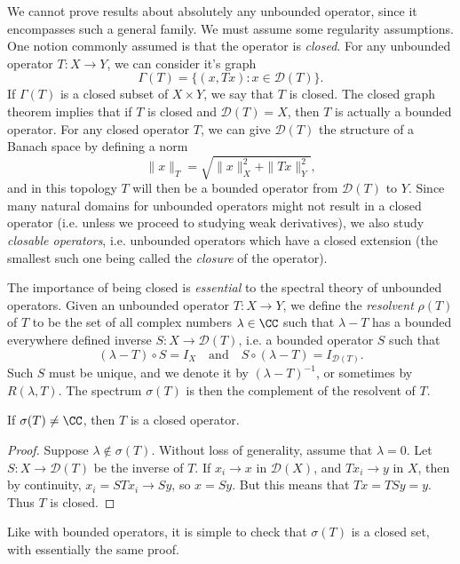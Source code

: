 We cannot prove results about absolutely any unbounded operator, since it encompasses such a general family. We must assume some regularity assumptions. One notion commonly assumed is that the operator is \emph{closed}. For any unbounded operator $T: X \to Y$, we can consider it's graph
%
\[ \Gamma(T) = \{ (x,Tx): x \in \mathcal{D}(T) \}. \]
%
If $\Gamma(T)$ is a closed subset of $X \times Y$, we say that $T$ is closed. The closed graph theorem implies that if $T$ is closed and $\mathcal{D}(T) = X$, then $T$ is actually a bounded operator. For any closed operator $T$, we can give $\mathcal{D}(T)$ the structure of a Banach space by defining a norm
%
\[ \| x \|_T = \sqrt{\| x \|_X^2 + \| Tx \|_Y^2}, \]
%
and in this topology $T$ will then be a bounded operator from $\mathcal{D}(T)$ to $Y$. Since many natural domains for unbounded operators might not result in a closed operator (i.e. unless we proceed to studying weak derivatives), we also study \emph{closable operators}, i.e. unbounded operators which have a closed extension (the smallest such one being called the \emph{closure} of the operator).

The importance of being closed is \emph{essential} to the spectral theory of unbounded operators. Given an unbounded operator $T: X \to Y$, we define the \emph{resolvent} $\rho(T)$ of $T$ to be the set of all complex numbers $\lambda \in \CC$ such that $\lambda - T$ has a bounded everywhere defined inverse $S: X \to \mathcal{D}(T)$, i.e. a bounded operator $S$ such that
%
\[ (\lambda - T) \circ S = I_X \quad\text{and}\quad S \circ (\lambda - T) = I_{\mathcal{D}(T)}. \]
%
Such $S$ must be unique, and we denote it by $(\lambda - T)^{-1}$, or sometimes by $R(\lambda,T)$. The spectrum $\sigma(T)$ is then the complement of the resolvent of $T$.

\begin{lemma}
    If $\sigma(T) \neq \CC$, then $T$ is a closed operator.
\end{lemma}
\begin{proof}
    Suppose $\lambda \not \in \sigma(T)$. Without loss of generality, assume that $\lambda = 0$. Let $S: X \to \mathcal{D}(T)$ be the inverse of $T$. If $x_i \to x$ in $\mathcal{D}(X)$, and $T x_i \to y$ in $X$, then by continuity, $x_i = STx_i \to Sy$, so $x = Sy$. But this means that $Tx = TSy = y$. Thus $T$ is closed.
\end{proof}

Like with bounded operators, it is simple to check that $\sigma(T)$ is a closed set, with essentially the same proof.

